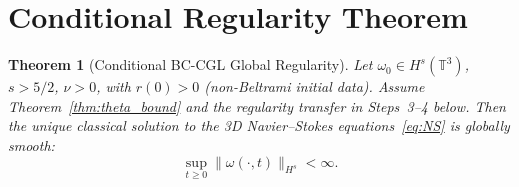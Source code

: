 \documentclass[12pt,a4paper]{article}
\newtheorem{theorem}{Theorem}[section]
\theoremstyle{definition}
\newcommand{\T}{\mathbb{T}}
\newcommand{\norm}[1]{\lVert #1 \rVert}
\begin{document}
\section{Conditional Regularity Theorem}\label{sec:proof}

\begin{theorem}[Conditional BC-CGL Global Regularity]\label{thm:main}
Let $\omega_0 \in H^s(\T^3)$, $s > 5/2$, $\nu > 0$, with $r(0) > 0$ (non-Beltrami initial data). Assume Theorem~\ref{thm:theta_bound} and the regularity transfer in Steps~3--4 below. Then the unique classical solution to the 3D Navier--Stokes equations~\eqref{eq:NS} is globally smooth:
\begin{equation}
  \sup_{t \geq 0} \norm{\omega(\cdot,t)}_{H^s} < \infty.
\end{equation}
\end{theorem}
\end{document}
